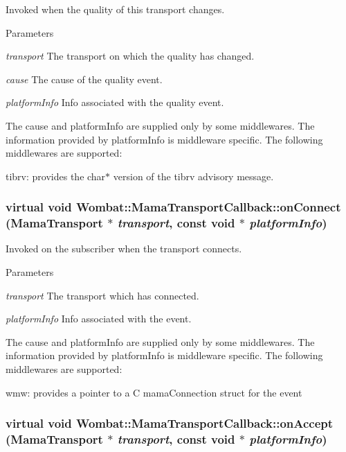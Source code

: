 Invoked when the quality of this transport changes. 
\begin{DoxyParams}{Parameters}
\item[{\em transport}]The transport on which the quality has changed. \item[{\em cause}]The cause of the quality event. \item[{\em platformInfo}]Info associated with the quality event.\end{DoxyParams}
The cause and platformInfo are supplied only by some middlewares. The information provided by platformInfo is middleware specific. The following middlewares are supported:

tibrv: provides the char$\ast$ version of the tibrv advisory message. \hypertarget{classWombat_1_1MamaTransportCallback_ae771d6e73c50bc7db49f1f449f23b3db}{
\subsubsection[{onConnect}]{\setlength{\rightskip}{0pt plus 5cm}virtual void Wombat::MamaTransportCallback::onConnect ({\bf MamaTransport} $\ast$ {\em transport}, \/  const void $\ast$ {\em platformInfo})}}
\label{classWombat_1_1MamaTransportCallback_ae771d6e73c50bc7db49f1f449f23b3db}


Invoked on the subscriber when the transport connects. 
\begin{DoxyParams}{Parameters}
\item[{\em transport}]The transport which has connected. \item[{\em platformInfo}]Info associated with the event.\end{DoxyParams}
The cause and platformInfo are supplied only by some middlewares. The information provided by platformInfo is middleware specific. The following middlewares are supported:

wmw: provides a pointer to a C mamaConnection struct for the event \hypertarget{classWombat_1_1MamaTransportCallback_a849ef4f0e6f2c9c829a83fff1be2ad22}{
\subsubsection[{onAccept}]{\setlength{\rightskip}{0pt plus 5cm}virtual void Wombat::MamaTransportCallback::onAccept ({\bf MamaTransport} $\ast$ {\em transport}, \/  const void $\ast$ {\em platformInfo})}}
\label{classWombat_1_1MamaTransportCallback_a849ef4f0e6f2c9c829a83fff1be2ad22}



